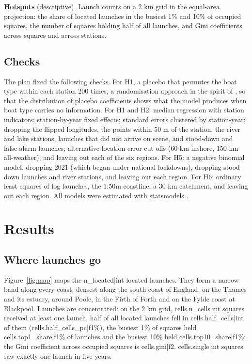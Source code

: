 \documentclass[11pt,a4paper]{article}
\begin{document}
\textbf{Hotspots} (descriptive). Launch counts on a 2 km grid in the equal-area projection: the share of located launches in the busiest 1\% and 10\% of occupied squares, the number of squares holding half of all launches, and Gini coefficients across squares and across stations.

\subsection{Checks}
The plan fixed the following checks. For H1, a placebo that permutes the boat type within each station 200 times, a randomisation approach in the spirit of \citet{young2019}, so that the distribution of placebo coefficients shows what the model produces when boat type carries no information. For H1 and H2: median regression \citep{koenker1978} with station indicators; station-by-year fixed effects; standard errors clustered by station-year; dropping the flipped longitudes, the points within 50 m of the station, the river and lake stations, launches that did not arrive on scene, and stood-down and false-alarm launches; alternative location-error cut-offs (60 km inshore, 150 km all-weather); and leaving out each of the six regions. For H5: a negative binomial model, dropping 2021 (which began under national lockdowns), dropping stood-down launches and river stations, and leaving out each region. For H6: ordinary least squares of log launches, the 1:50m coastline, a 30 km catchment, and leaving out each region. All models were estimated with statsmodels \citep{seabold2010}.

\section{Results}\label{sec:results}
\subsection{Where launches go}
Figure~\ref{fig:map} maps the {{n_located|int}} located launches. They form a narrow band along every coast, densest along the south coast of England, on the Thames and its estuary, around Poole, in the Firth of Forth and on the Fylde coast at Blackpool. Launches are concentrated: on the 2 km grid, {{cells.n_cells|int}} squares received at least one launch, half of all located launches fell in {{cells.half_cells|int}} of them ({{cells.half_cells_pc|f1}}\%), the busiest 1\% of squares held {{cells.top1_share|f1}}\% of launches and the busiest 10\% held {{cells.top10_share|f1}}\%; the Gini coefficient across occupied squares is {{cells.gini|f2}}. {{cells.single|int}} squares saw exactly one launch in five years.
\end{document}
